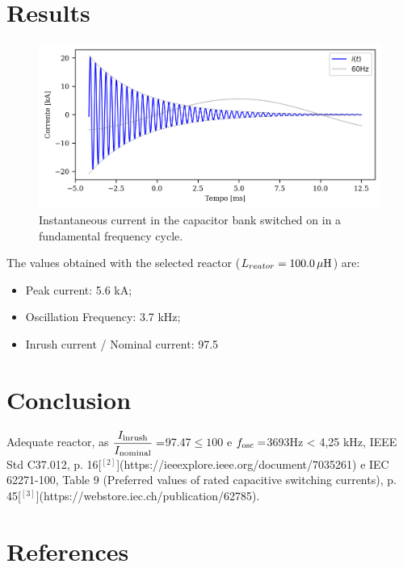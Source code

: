 \documentclass[a4paper]{article}
\begin{document}
	\section{Results}
	\begin{figure}[!hbp]
		\centering
		\includegraphics{Correntes.png}
		\caption{Instantaneous current in the capacitor bank switched on in a fundamental frequency cycle.}
		\label{fig:picture2}
	\end{figure}
	
	The values obtained with the selected reactor ($L_{reator} = {{100.0}} \, \mu \rm{H} $) are:
	\begin{itemize}[label=\textendash]
		\item Peak current: {{5.6 kA}};
		\item Oscillation Frequency: {{3.7 k}}Hz;
		\item Inrush current / Nominal current: {{97.5}}
	\end{itemize}
	
	\section{Conclusion}
	{{Adequate reactor, as $\dfrac{I_{\rm inrush}}{I_{\rm nominal}} = $97.47$\le 100$ e $f_{\rm osc} = $3693Hz < 4,25 kHz, IEEE Std C37.012, p. 16[$^{[2]}$](https://ieeexplore.ieee.org/document/7035261) e IEC 62271-100, Table 9 (Preferred values of rated capacitive switching currents), p. 45[$^{[3]}$](https://webstore.iec.ch/publication/62785).}}
	
	\section{References}
	
\end{document}
